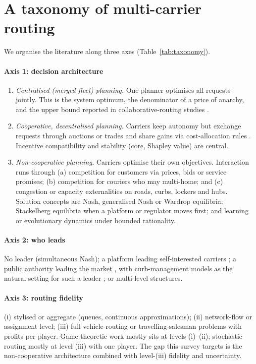 \documentclass[preprint,12pt]{elsarticle}
\begin{document}
\section{A taxonomy of multi-carrier routing}\label{sec:taxonomy}

We organise the literature along three axes (Table~\ref{tab:taxonomy}).

\paragraph{Axis 1: decision architecture}
\begin{enumerate}[leftmargin=*]
\item \emph{Centralised (merged-fleet) planning.} One planner optimises all requests jointly. This is the system optimum, the denominator of a price of anarchy, and the upper bound reported in collaborative-routing studies \cite{GanstererHartl2018}.
\item \emph{Cooperative, decentralised planning.} Carriers keep autonomy but exchange requests through auctions or trades and share gains via cost-allocation rules \cite{GanstererHartl2018,GanstererHartl2020top,Guajardo2016,Cleophas2019}. Incentive compatibility and stability (core, Shapley value) are central.
\item \emph{Non-cooperative planning.} Carriers optimise their own objectives. Interaction runs through (a) competition for customers via prices, bids or service promises; (b) competition for couriers who may multi-home; and (c) congestion or capacity externalities on roads, curbs, lockers and hubs. Solution concepts are Nash, generalised Nash or Wardrop equilibria; Stackelberg equilibria when a platform or regulator moves first; and learning or evolutionary dynamics under bounded rationality.
\end{enumerate}

\paragraph{Axis 2: who leads} No leader (simultaneous Nash); a platform leading self-interested carriers \cite{Cerulli2024}; a public authority leading the market \cite{Catalano2014}, with curb-management models as the natural setting for such a leader \cite{XuSun2024}; or multi-level structures.

\paragraph{Axis 3: routing fidelity} (i) stylised or aggregate (queues, continuous approximations); (ii) network-flow or assignment level; (iii) full vehicle-routing or travelling-salesman problems with profits per player. Game-theoretic work mostly sits at levels (i)--(ii); stochastic routing mostly at level (iii) with one player. The gap this survey targets is the non-cooperative architecture combined with level-(iii) fidelity and uncertainty.
\end{document}
